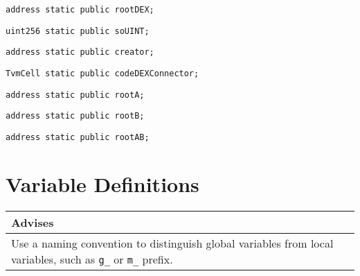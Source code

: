 \begin{lstlisting}[firstnumber=19]
  address static public rootDEX;
\end{lstlisting}

\begin{lstlisting}[firstnumber=20]
  uint256 static public soUINT;
\end{lstlisting}

\begin{lstlisting}[firstnumber=21]
  address static public creator;
\end{lstlisting}

\begin{lstlisting}[firstnumber=22]
  TvmCell static public codeDEXConnector;
\end{lstlisting}

\begin{lstlisting}[firstnumber=23]
  address static public rootA;
\end{lstlisting}

\begin{lstlisting}[firstnumber=24]
  address static public rootB;
\end{lstlisting}

\begin{lstlisting}[firstnumber=25]
  address static public rootAB;
\end{lstlisting}

\section{Variable Definitions}


\ifsoldraft
\noindent\begin{tabular}{|p{12cm}|}\hline
\rowcolor{green}Advises
\\\hline
Use a naming convention to distinguish global variables from local variables, such as \verb+g_+ or \verb+m_+ prefix.
\\\hline\end{tabular}
\fi

